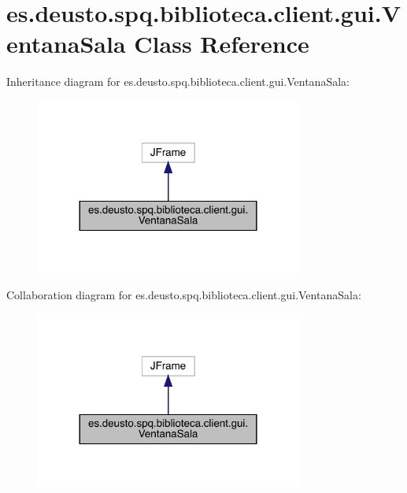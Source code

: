 \hypertarget{classes_1_1deusto_1_1spq_1_1biblioteca_1_1client_1_1gui_1_1_ventana_sala}{}\section{es.\+deusto.\+spq.\+biblioteca.\+client.\+gui.\+Ventana\+Sala Class Reference}
\label{classes_1_1deusto_1_1spq_1_1biblioteca_1_1client_1_1gui_1_1_ventana_sala}


Inheritance diagram for es.\+deusto.\+spq.\+biblioteca.\+client.\+gui.\+Ventana\+Sala\+:
\nopagebreak
\begin{figure}[H]
\begin{center}
\leavevmode
\includegraphics[width=248pt]{classes_1_1deusto_1_1spq_1_1biblioteca_1_1client_1_1gui_1_1_ventana_sala__inherit__graph}
\end{center}
\end{figure}


Collaboration diagram for es.\+deusto.\+spq.\+biblioteca.\+client.\+gui.\+Ventana\+Sala\+:
\nopagebreak
\begin{figure}[H]
\begin{center}
\leavevmode
\includegraphics[width=248pt]{classes_1_1deusto_1_1spq_1_1biblioteca_1_1client_1_1gui_1_1_ventana_sala__coll__graph}
\end{center}
\end{figure}
